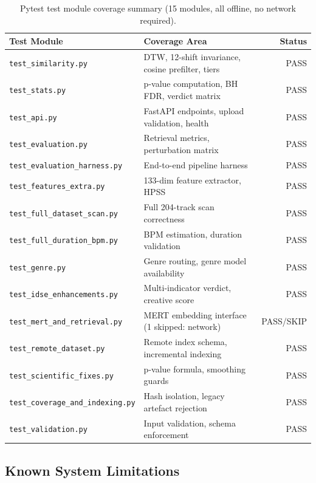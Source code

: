 \documentclass[12pt,a4paper]{article}
\begin{document}
\renewcommand{\arraystretch}{1.2}
\begin{table}[H]
\centering
\caption{Pytest test module coverage summary (15 modules, all offline, no network required).}
\label{tab:pytest}
\begin{tabularx}{\textwidth}{|l|X|r|}
\hline
\textbf{Test Module} & \textbf{Coverage Area} & \textbf{Status} \\
\hline
\texttt{test\_similarity.py} & DTW, 12-shift invariance, cosine prefilter, tiers & PASS \\
\hline
\texttt{test\_stats.py} & p-value computation, BH FDR, verdict matrix & PASS \\
\hline
\texttt{test\_api.py} & FastAPI endpoints, upload validation, health & PASS \\
\hline
\texttt{test\_evaluation.py} & Retrieval metrics, perturbation matrix & PASS \\
\hline
\texttt{test\_evaluation\_harness.py} & End-to-end pipeline harness & PASS \\
\hline
\texttt{test\_features\_extra.py} & 133-dim feature extractor, HPSS & PASS \\
\hline
\texttt{test\_full\_dataset\_scan.py} & Full 204-track scan correctness & PASS \\
\hline
\texttt{test\_full\_duration\_bpm.py} & BPM estimation, duration validation & PASS \\
\hline
\texttt{test\_genre.py} & Genre routing, genre model availability & PASS \\
\hline
\texttt{test\_idse\_enhancements.py} & Multi-indicator verdict, creative score & PASS \\
\hline
\texttt{test\_mert\_and\_retrieval.py} & MERT embedding interface (1 skipped: network) & PASS/SKIP \\
\hline
\texttt{test\_remote\_dataset.py} & Remote index schema, incremental indexing & PASS \\
\hline
\texttt{test\_scientific\_fixes.py} & p-value formula, smoothing guards & PASS \\
\hline
\texttt{test\_coverage\_and\_indexing.py} & Hash isolation, legacy artefact rejection & PASS \\
\hline
\texttt{test\_validation.py} & Input validation, schema enforcement & PASS \\
\hline
\end{tabularx}
\end{table}

\subsection{Known System Limitations}
\end{document}
